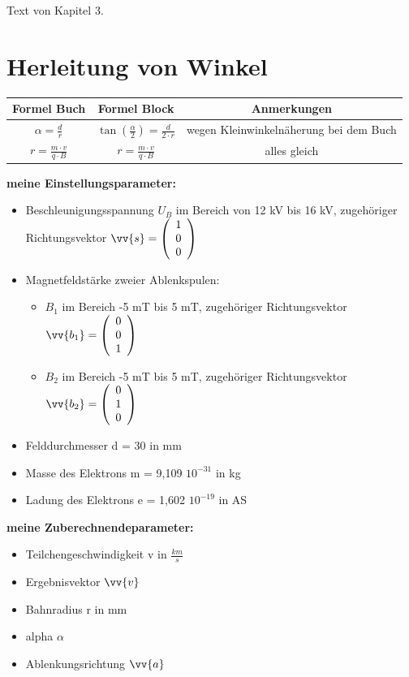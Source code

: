Text von Kapitel 3.
\section{\textbf{Herleitung von Winkel}}

\begin{tabular}{c|c|c}
     Formel Buch & Formel Block & Anmerkungen  \\
     \hline
    $\alpha = \frac{d}{r}$ &$\tan(\frac{\alpha}{2}) = \frac{d}{2\cdot r}$& wegen Kleinwinkelnäherung bei dem Buch \\
    \hline
   $r = \frac{m\cdot v}{q\cdot B}$  & $r = \frac{m\cdot v}{q\cdot B}$& alles gleich 
     
\end{tabular}
\newline \textbf{meine Einstellungsparameter:}

\begin{itemize}
    \item Beschleunigungsspannung $U_B$ im Bereich von 12 kV bis 16 kV, zugehöriger Richtungsvektor $\vv{s} = \vektor{1}{0}{0}$
    \item Magnetfeldstärke zweier Ablenkspulen:
    
    \begin{itemize}
        \item $B_1$ im Bereich -5 mT bis 5 mT, zugehöriger Richtungsvektor $\vv{b_1} = \vektor{0}{0}{1}$ %
        \item $B_2$ im Bereich -5 mT bis 5 mT, zugehöriger Richtungsvektor $\vv{b_2} = \vektor{0}{1}{0}$ %
    \end{itemize}
    
    \item Felddurchmesser d = 30 in mm
    \item Masse des Elektrons m =  9,109 \cdot $10^{-31}$ in kg
    \item Ladung des Elektrons e = 1,602 \cdot $10^{-19}$ in AS
\end{itemize}

\newline \textbf{meine Zuberechnendeparameter:}

\begin{itemize}
    \item Teilchengeschwindigkeit v in $\frac{km}{s}$
    \item Ergebnisvektor $\vv{v}$
    \item Bahnradius r in mm 
    \item alpha $\alpha$
    \item Ablenkungsrichtung $\vv{a}$
\end{itemize}

